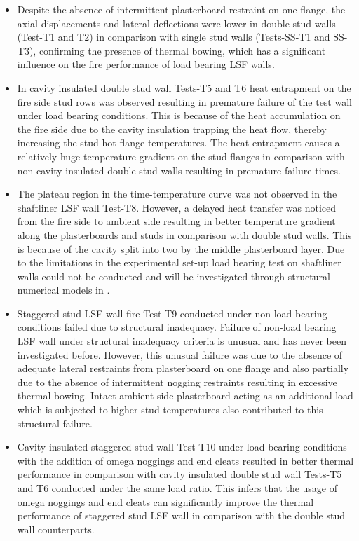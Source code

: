 \begin{itemize}
	\item Despite the absence of intermittent plasterboard restraint on one flange, the axial displacements and lateral deflections were lower in double stud walls (Test-T1 and T2) in comparison with single stud walls (Tests-SS-T1 and SS-T3), confirming the presence of thermal bowing, which has a significant influence on the fire performance of load bearing LSF walls.
	\item In cavity insulated double stud wall Tests-T5 and T6 heat entrapment on the fire side stud rows was observed resulting in premature failure of the test wall under load bearing conditions. This is because of the heat accumulation on the fire side due to the cavity insulation trapping the heat flow, thereby increasing the stud hot flange temperatures. The heat entrapment causes a relatively huge temperature gradient on the stud flanges in comparison with non-cavity insulated double stud walls resulting in premature failure times.
	\item The plateau region in the time-temperature curve was not observed in the shaftliner LSF wall Test-T8. However, a delayed heat transfer was noticed from the fire side to ambient side resulting in better temperature gradient along the plasterboards and studs in comparison with double stud walls. This is because of the cavity split into two by the middle plasterboard layer. Due to the limitations in the experimental set-up load bearing test on shaftliner walls could not be conducted and will be investigated through structural numerical models in . 
	\item Staggered stud LSF wall fire Test-T9 conducted under non-load bearing conditions failed due to structural inadequacy. Failure of non-load bearing LSF wall under structural inadequacy criteria is unusual and has never been investigated before. However, this unusual failure was due to the absence of adequate lateral restraints from plasterboard on one flange and also partially due to the absence of intermittent nogging restraints resulting in excessive thermal bowing. Intact ambient side plasterboard acting as an additional load which is subjected to higher stud temperatures also contributed to this structural failure. 
	\item Cavity insulated staggered stud wall Test-T10 under load bearing conditions with the addition of omega noggings and end cleats resulted in better thermal performance in comparison with cavity insulated double stud wall Tests-T5 and T6 conducted under the same load ratio. This infers that the usage of omega noggings and end cleats can significantly improve the thermal performance of staggered stud LSF wall in comparison with the double stud wall counterparts. 

\end{itemize}
